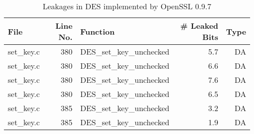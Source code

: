 \begin{table}[!ht]
\centering\tiny\scriptsize
\caption{Leakages in DES implemented by OpenSSL 0.9.7}\label{tab:DESOpenSSL0.9.7}
\begin{tabular}{lrlrr}
\hline
\textbf{File} & \textbf{Line No.} & \textbf{Function} & \textbf{\# Leaked Bits} & \textbf{Type} \\\hline
set\_key.c& 380&DES\_set\_key\_unchecked&5.7 &DA\\
set\_key.c& 380&DES\_set\_key\_unchecked&6.6 &DA\\
set\_key.c& 380&DES\_set\_key\_unchecked&7.6 &DA\\
set\_key.c& 380&DES\_set\_key\_unchecked&6.5 &DA\\
set\_key.c& 385&DES\_set\_key\_unchecked&3.2 &DA\\
set\_key.c& 385&DES\_set\_key\_unchecked&1.9 &DA\\
\hline
\end{tabular}
\renewcommand{\baselinestretch}{1.0}\selectfont
\end{table}
